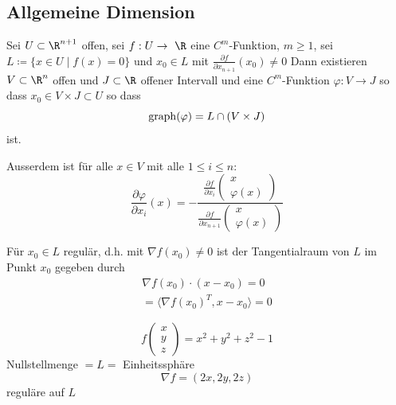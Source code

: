 \subsection{Allgemeine Dimension}
\begin{satz*}
	Sei $U \subset \R^{n+1}$ offen, sei $f: U \rightarrow \R$ eine $C^m$-Funktion, $m \geq 1$, sei $L \coloneqq \{ x \in U \mid f(x) = 0 \}$ und $x_0 \in L$ mit $\frac{\partial f}{\partial x_{n+1}}(x_0) \neq 0$ Dann existieren $V \subset \R^n$ offen und $J \subset \R$ offener Intervall und eine $C^m$-Funktion $\varphi: V \rightarrow J$ so dass $x_0 \in V \times J \subset U$ so dass 
	\[ \operatorname{graph}(\varphi) = L \cap ( V \times J ) \]
	ist.
	
	Ausserdem ist für alle $x \in V$ mit alle $1 \leq i \leq n$:
	\[ \frac{\partial \varphi}{\partial x_i}(x) = - \frac{\frac{\partial f}{\partial x_i}\begin{pmatrix} x \\ \varphi(x) \end{pmatrix}}{\frac{\partial f}{\partial x_{n+1}}\begin{pmatrix} x \\ \varphi(x) \end{pmatrix}} \]
\end{satz*}
\begin{bem}
	Für $x_0 \in L$ regulär, d.h. mit $\nabla f(x_0) \neq 0$ ist der Tangentialraum von $L$ im Punkt $x_0$ gegeben durch
	\begin{gather*}
		\nabla f(x_0) \cdot (x - x_0) = 0 \\
		= \langle \nabla f(x_0)^T , x - x_0 \rangle = 0
	\end{gather*}
\end{bem}
\begin{bsp*}
	\[ f\begin{pmatrix} x \\ y \\ z \end{pmatrix} = x^2 + y^2 + z^2 - 1 \]
	Nullstellmenge $= L = $ Einheitssphäre
	\[ \nabla f = ( 2x , 2y , 2z ) \]
	reguläre auf $L$
\end{bsp*}
